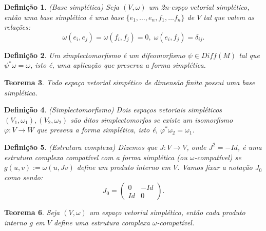 \documentclass[12pt]{book}
\newtheorem{teorema}{Teorema}[section]
\newtheorem{definicao}[teorema]{Definição}
\newcommand{\vermelho}[1]{{\color{red}#1}}
\begin{document}
	\begin{definicao}
		(Base simplética) Seja $(V, \omega)$ um 2n-espço vetorial simplético, então uma base simplética é uma base $\{ e_{1},\dots, e_{n},f_{1},\dots f_{n}\}$ de $V$ tal que valem as relações:
		$$
		\omega(e_{i}, e_{j}) = \omega(f_{i}, f_{j}) = 0, \; \omega(e_{i}, f_{j}) = \delta_{ij}.
		$$
	\end{definicao}
	
	\begin{definicao}
		Um simplectomorfismo é um difeomorfismo $\psi \in Diff(M)$ tal que $\psi^{*}\omega = \omega$, isto é, uma aplicação que preserva a forma simplética.
	\end{definicao}
	
	\begin{teorema}
		\vermelho{Todo espaço vetorial simpético de dimensão finita possui uma base simplética.}
	\end{teorema}
	
	\begin{definicao}
		(Simplectomorfismo) Dois espaços vetoriais simpléticos $(V_{1}, \omega_{1}), (V_{2}, \omega_{2})$ são ditos simplectomorfos se existe um isomorfismo $\varphi:V\to W$ que preseva a forma simplética, isto é, $\varphi^{*}\omega_{2} = \omega_{1}$.
	\end{definicao}
	
	\begin{definicao}
		(Estrutura complexa) Dizemos que $J: V \to V$, onde $J^{2} = -Id$, é uma estrutura complexa compatível com a forma simplética (ou $\omega$-compatível) se $g(u,v):=\omega(u, Jv)$ define um produto interno em $V$. Vamos fixar a notação $J_{0}$ como sendo:
		$$
		J_{0}=
		\left(
			\begin{array}{cc}
			0 & -Id
			\\
			Id & 0
			\end{array}
		\right).
		$$
		
	\end{definicao}
	
	\begin{teorema}
		\vermelho{
			Seja $(V, \omega)$ um espaço vetorial simplético, então cada produto interno $g$ em $V$ define uma estrutura complexa $\omega$-compatível.}
	\end{teorema}
	
\end{document}
